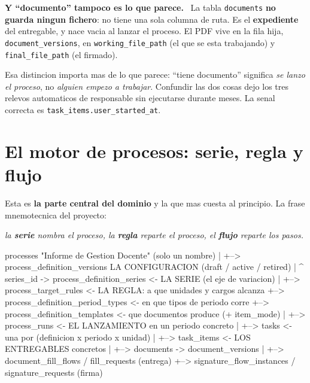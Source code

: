 \documentclass[11pt,a4paper,oneside]{report}
\newenvironment{aviso}[1][Aviso]{%
  \par\medskip
  \colorlet{shadecolor}{orange!14}%
  \begin{shaded}\noindent\textbf{\color{orange!45!black}#1.}\ \ignorespaces}%
  {\end{shaded}\par\medskip}
\newcommand{\rt}[1]{\texttt{#1}}
\begin{document}
\begin{aviso}[Y ``documento'' tampoco es lo que parece]
La tabla \rt{documents} \textbf{no guarda ningun fichero}: no tiene una sola columna de ruta.
Es el \textbf{expediente} del entregable, y nace vacia al lanzar el proceso. El PDF vive en la
fila hija, \rt{document\_versions}, en \rt{working\_file\_path} (el que se esta trabajando) y
\rt{final\_file\_path} (el firmado).

Esa distincion importa mas de lo que parece: ``tiene documento'' significa \emph{se lanzo el
proceso}, no \emph{alguien empezo a trabajar}. Confundir las dos cosas dejo los tres relevos
automaticos de responsable sin ejecutarse durante meses. La senal correcta es
\rt{task\_items.user\_started\_at}.
\end{aviso}

\section{El motor de procesos: serie, regla y flujo}

Esta es \textbf{la parte central del dominio} y la que mas cuesta al principio. La frase
mnemotecnica del proyecto:

\begin{center}
\emph{la \textbf{serie} nombra el proceso, la \textbf{regla} reparte el proceso,
el \textbf{flujo} reparte los pasos.}
\end{center}

\begin{diagrama}
processes                          "Informe de Gestion Docente"  (solo un nombre)
   |
   +--> process_definition_versions      LA CONFIGURACION (draft / active / retired)
          |    ^ series_id -> process_definition_series   <- LA SERIE (el eje de variacion)
          |
          +--> process_target_rules              <- LA REGLA: a que unidades y cargos alcanza
          +--> process_definition_period_types   <- en que tipos de periodo corre
          +--> process_definition_templates      <- que documentos produce (+ item_mode)
          |
          +--> process_runs                      <- EL LANZAMIENTO en un periodo concreto
                 |
                 +--> tasks                      <- una por (definicion x periodo x unidad)
                        |
                        +--> task_items          <- LOS ENTREGABLES concretos
                               |
                               +--> documents -> document_versions
                                      |
                                      +--> document_fill_flows / fill_requests      (entrega)
                                      +--> signature_flow_instances / signature_requests (firma)
\end{diagrama}
\end{document}
